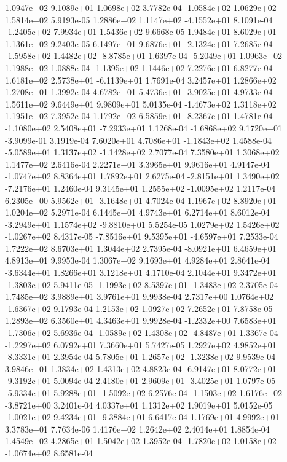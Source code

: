1.0947e+02 9.1089e+01 1.0698e+02  3.7782e-04
-1.0584e+02  1.0629e+02  1.5814e+02  5.9193e-05
 1.2886e+02  1.1147e+02 -4.1552e+01  8.1091e-04
-1.2405e+02  7.9934e+01  1.5436e+02  9.6668e-05
1.9484e+01 8.6029e+01 1.1361e+02  9.2403e-05
 6.1497e+01  9.6876e+01 -2.1324e+01  7.2685e-04
-1.5958e+02  1.4482e+02 -8.8785e+01  1.6397e-04
-5.2049e+01  1.0963e+02  1.1988e+02  1.0888e-04
-1.1395e+02  1.1446e+02  7.2276e+01  6.8277e-04
 1.6181e+02  2.5738e+01 -6.1139e+01  1.7691e-04
3.2457e+01 1.2866e+02 1.2708e+01  1.3992e-04
 4.6782e+01  5.4736e+01 -3.9025e+01  4.9733e-04
1.5611e+02 9.6449e+01 9.9809e+01  5.0135e-04
-1.4673e+02  1.3118e+02  1.1951e+02  7.3952e-04
 1.1792e+02  6.5859e+01 -8.2367e+01  1.4781e-04
-1.1080e+02  2.5408e+01 -7.2933e+01  1.1268e-04
-1.6868e+02  9.1720e+01 -3.9099e-01  3.1919e-04
 7.6020e+01  4.7086e+01 -1.1843e+02  1.4588e-04
-5.0589e+01  1.3137e+02 -1.1428e+02  2.7077e-04
7.3580e+01 1.3068e+02 1.1477e+02  2.6416e-04
2.2271e+01 3.3965e+01 9.9616e+01  4.9147e-04
-1.0747e+02  8.8364e+01  1.7892e+01  2.6275e-04
-2.8151e+01  1.3490e+02 -7.2176e+01  1.2460e-04
 9.3145e+01  1.2555e+02 -1.0095e+02  1.2117e-04
 6.2305e+00  5.9562e+01 -3.1648e+01  4.7024e-04
1.1967e+02 8.8920e+01 1.0204e+02  5.2971e-04
6.1445e+01 4.9743e+01 6.2714e+01  8.6012e-04
-3.2949e+01  1.1574e+02 -9.8810e+01  5.5254e-05
 1.0279e+02  1.5426e+02 -1.0267e+02  8.4317e-05
-7.8516e+01  9.5395e+01 -4.6597e+01  7.2533e-04
1.7222e+02 8.6703e+01 1.3044e+02  2.7395e-04
-8.0921e+01  6.4659e+01  4.8913e+01  9.9953e-04
1.3067e+02 9.1693e+01 4.9284e+01  2.8641e-04
-3.6344e+01  1.8266e+01  3.1218e+01  4.1710e-04
 2.1044e+01  9.3472e+01 -1.3803e+02  5.9411e-05
-1.1993e+02  8.5397e+01 -1.3483e+02  2.3705e-04
1.7485e+02 3.9889e+01 3.9761e+01  9.9938e-04
 2.7317e+00  1.0764e+02 -1.6367e+02  9.1793e-04
1.2153e+02 1.0927e+02 7.2652e+01  7.8758e-05
1.2893e+02 6.3560e+01 4.3463e+01  9.9928e-04
-1.2332e+00  7.6583e+01 -1.7306e+02  5.6936e-04
-1.0589e+02  1.4308e+02 -4.8487e+01  1.3367e-04
-1.2297e+02  6.0792e+01  7.3660e+01  5.7427e-05
 1.2927e+02  4.9852e+01 -8.3331e+01  2.3954e-04
 5.7805e+01  1.2657e+02 -1.3238e+02  9.9539e-04
3.9846e+01 1.3834e+02 1.4313e+02  4.8823e-04
-6.9147e+01  8.0772e+01 -9.3192e+01  5.0094e-04
 2.4180e+01  2.9609e+01 -3.4025e+01  1.0797e-05
-5.9334e+01  5.9288e+01 -1.5092e+02  6.2576e-04
-1.1503e+02  1.6176e+02 -3.8721e+00  3.2401e-04
4.0337e+01 1.1312e+02 1.9019e+01  5.0152e-05
-1.0021e+02  9.4234e+01 -9.3884e+01  6.6417e-04
1.1769e+01 4.9992e+01 3.3783e+01  7.7634e-06
1.4176e+02 1.2642e+02 2.4014e+01  1.8854e-04
1.4549e+02 4.2865e+01 1.5042e+02  1.3952e-04
-1.7820e+02  1.0158e+02 -1.0674e+02  8.6581e-04
